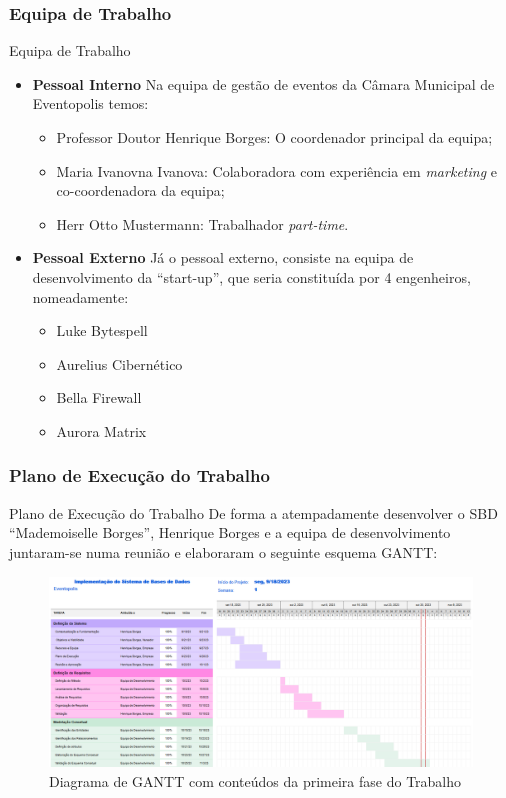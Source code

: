 \documentclass[compress,svgnames,handout,13.7pt]{beamer}
\begin{document}
\subsubsection{Equipa de Trabalho}
\begin{frame}{Equipa de Trabalho}
\begin{itemize} 
                 \item{\textbf{Pessoal Interno}}
                   Na equipa de gest\~ao de eventos da C\^amara Municipal de Eventopolis temos:
                   \begin{itemize}
                     \item{Professor Doutor Henrique Borges:} O coordenador principal da equipa;
                     \item{Maria Ivanovna Ivanova:} Colaboradora com experi\^encia em \textit{marketing} e co-coordenadora
                       da equipa;
                     \item{Herr Otto Mustermann:} Trabalhador \textit{part-time}.
                   \end{itemize}
                 \item{\textbf{Pessoal Externo}}
                   Já o pessoal externo, consiste na equipa de desenvolvimento da ``start-up'',
                   que seria constituída por 4 engenheiros, nomeadamente:
                   \begin{itemize}
                     \item Luke Bytespell
                     \item Aurelius Cibern\'etico
                     \item Bella Firewall
                     \item Aurora Matrix
                   \end{itemize}
             \end{itemize}
\end{frame}

\subsubsection{Plano de Execução do Trabalho}
\begin{frame}{Plano de Execução do Trabalho}
De forma a atempadamente desenvolver o SBD ``Mademoiselle Borges'', Henrique Borges e a equipa de desenvolvimento juntaram-se numa reuni\~ao e elaboraram o seguinte esquema GANTT:
\begin{figure}[h]
            \centering
            \includegraphics[width=4.5in]{images/GANTT1_c1.png}
            \caption{Diagrama de GANTT com conteúdos da primeira fase do Trabalho}
        \end{figure}
\end{frame}
\end{document}
